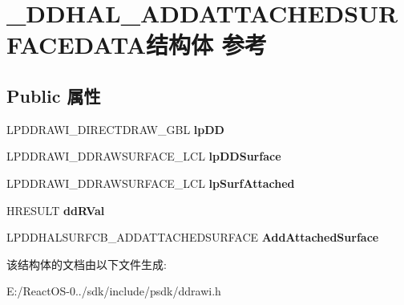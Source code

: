 \hypertarget{struct___d_d_h_a_l___a_d_d_a_t_t_a_c_h_e_d_s_u_r_f_a_c_e_d_a_t_a}{}\section{\+\_\+\+D\+D\+H\+A\+L\+\_\+\+A\+D\+D\+A\+T\+T\+A\+C\+H\+E\+D\+S\+U\+R\+F\+A\+C\+E\+D\+A\+T\+A结构体 参考}
\label{struct___d_d_h_a_l___a_d_d_a_t_t_a_c_h_e_d_s_u_r_f_a_c_e_d_a_t_a}
\subsection*{Public 属性}
\begin{DoxyCompactItemize}
\item 
\mbox{\label{struct___d_d_h_a_l___a_d_d_a_t_t_a_c_h_e_d_s_u_r_f_a_c_e_d_a_t_a_ab488b8967a4ec601caea828c536db80e}} 
L\+P\+D\+D\+R\+A\+W\+I\+\_\+\+D\+I\+R\+E\+C\+T\+D\+R\+A\+W\+\_\+\+G\+BL {\bfseries lp\+DD}
\item 
\mbox{\label{struct___d_d_h_a_l___a_d_d_a_t_t_a_c_h_e_d_s_u_r_f_a_c_e_d_a_t_a_a8ad8b074667a68e70b82cce1e161aae5}} 
L\+P\+D\+D\+R\+A\+W\+I\+\_\+\+D\+D\+R\+A\+W\+S\+U\+R\+F\+A\+C\+E\+\_\+\+L\+CL {\bfseries lp\+D\+D\+Surface}
\item 
\mbox{\label{struct___d_d_h_a_l___a_d_d_a_t_t_a_c_h_e_d_s_u_r_f_a_c_e_d_a_t_a_a99caf7915eddaf08902d629afeeae8ed}} 
L\+P\+D\+D\+R\+A\+W\+I\+\_\+\+D\+D\+R\+A\+W\+S\+U\+R\+F\+A\+C\+E\+\_\+\+L\+CL {\bfseries lp\+Surf\+Attached}
\item 
\mbox{\label{struct___d_d_h_a_l___a_d_d_a_t_t_a_c_h_e_d_s_u_r_f_a_c_e_d_a_t_a_a0c68f288526d6ce7f59d502b7733122e}} 
H\+R\+E\+S\+U\+LT {\bfseries dd\+R\+Val}
\item 
\mbox{\label{struct___d_d_h_a_l___a_d_d_a_t_t_a_c_h_e_d_s_u_r_f_a_c_e_d_a_t_a_a9055f2f2939ce1a7ef6a339249fad22a}} 
L\+P\+D\+D\+H\+A\+L\+S\+U\+R\+F\+C\+B\+\_\+\+A\+D\+D\+A\+T\+T\+A\+C\+H\+E\+D\+S\+U\+R\+F\+A\+CE {\bfseries Add\+Attached\+Surface}
\end{DoxyCompactItemize}


该结构体的文档由以下文件生成\+:\begin{DoxyCompactItemize}
\item 
E\+:/\+React\+O\+S-\/0../sdk/include/psdk/ddrawi.\+h\end{DoxyCompactItemize}
